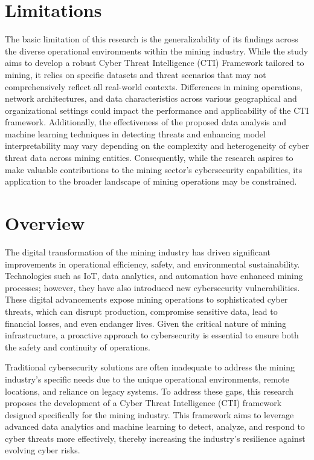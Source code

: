 \documentclass[a4paper,twoside,12pt]{report}
\begin{document}
\section{Limitations}
The basic limitation of this research is the generalizability of its findings across the diverse operational environments within the mining industry. While the study aims to develop a robust Cyber Threat Intelligence (CTI) Framework tailored to mining, it relies on specific datasets and threat scenarios that may not comprehensively reflect all real-world contexts. Differences in mining operations, network architectures, and data characteristics across various geographical and organizational settings could impact the performance and applicability of the CTI framework. Additionally, the effectiveness of the proposed data analysis and machine learning techniques in detecting threats and enhancing model interpretability may vary depending on the complexity and heterogeneity of cyber threat data across mining entities. Consequently, while the research aspires to make valuable contributions to the mining sector's cybersecurity capabilities, its application to the broader landscape of mining operations may be constrained.\\
\section{Overview}

The digital transformation of the mining industry has driven significant improvements in operational efficiency, safety, and environmental sustainability. Technologies such as IoT, data analytics, and automation have enhanced mining processes; however, they have also introduced new cybersecurity vulnerabilities. These digital advancements expose mining operations to sophisticated cyber threats, which can disrupt production, compromise sensitive data, lead to financial losses, and even endanger lives. Given the critical nature of mining infrastructure, a proactive approach to cybersecurity is essential to ensure both the safety and continuity of operations.

Traditional cybersecurity solutions are often inadequate to address the mining industry’s specific needs due to the unique operational environments, remote locations, and reliance on legacy systems. To address these gaps, this research proposes the development of a Cyber Threat Intelligence (CTI) framework designed specifically for the mining industry. This framework aims to leverage advanced data analytics and machine learning to detect, analyze, and respond to cyber threats more effectively, thereby increasing the industry’s resilience against evolving cyber risks.
\end{document}
